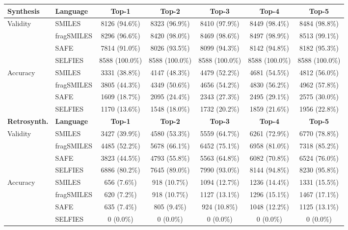 \begin{tabular}{llccccc}
    \toprule
    \textbf{Synthesis} & \textbf{Language} & \textbf{Top-1} & \textbf{Top-2} & \textbf{Top-3} & \textbf{Top-4} & \textbf{Top-5} \\
    \toprule
    Validity & SMILES & 8126 (94.6\%) & 8323 (96.9\%) & 8410 (97.9\%) & 8449 (98.4\%) & 8484 (98.8\%) \\
    ~ & fragSMILES & 8296 (96.6\%) & 8420 (98.0\%) & 8469 (98.6\%) & 8497 (98.9\%) & 8513 (99.1\%) \\
    ~ & SAFE & 7814 (91.0\%) & 8026 (93.5\%) & 8099 (94.3\%) & 8142 (94.8\%) & 8182 (95.3\%) \\
    ~ & SELFIES & 8588 (100.0\%) & 8588 (100.0\%) & 8588 (100.0\%) & 8588 (100.0\%) & 8588 (100.0\%) \\
    \hline
    Accuracy & SMILES & 3331 (38.8\%) & 4147 (48.3\%) & 4479 (52.2\%) & 4681 (54.5\%) & 4812 (56.0\%) \\
    ~ & fragSMILES & 3805 (44.3\%) & 4349 (50.6\%) & 4656 (54.2\%) & 4830 (56.2\%) & 4962 (57.8\%) \\
    ~ & SAFE & 1609 (18.7\%) & 2095 (24.4\%) & 2343 (27.3\%) & 2495 (29.1\%) & 2575 (30.0\%) \\
    ~ & SELFIES & 1170 (13.6\%) & 1548 (18.0\%) & 1732 (20.2\%) & 1859 (21.6\%) & 1956 (22.8\%) \\
    \toprule
    \textbf{Retrosynth.} &  \textbf{Language} & \textbf{Top-1} & \textbf{Top-2} & \textbf{Top-3} & \textbf{Top-4} & \textbf{Top-5}\\
    \toprule
    Validity & SMILES & 3427 (39.9\%) & 4580 (53.3\%) & 5559 (64.7\%) & 6261 (72.9\%) & 6770 (78.8\%) \\
    ~ & fragSMILES & 4485 (52.2\%) & 5678 (66.1\%) & 6452 (75.1\%) & 6958 (81.0\%) & 7318 (85.2\%) \\
    ~ & SAFE & 3823 (44.5\%) & 4793 (55.8\%) & 5563 (64.8\%) & 6082 (70.8\%) & 6524 (76.0\%) \\
    ~ & SELFIES & 6886 (80.2\%) & 7645 (89.0\%) & 7990 (93.0\%) & 8144 (94.8\%) & 8230 (95.8\%) \\
    \hline
    Accuracy & SMILES & 656 (7.6\%) & 918 (10.7\%) & 1094 (12.7\%) & 1236 (14.4\%) & 1331 (15.5\%) \\
    ~ & fragSMILES & 620 (7.2\%) & 918 (10.7\%) & 1127 (13.1\%) & 1296 (15.1\%) & 1467 (17.1\%) \\
    ~ & SAFE & 635 (7.4\%) & 805 (9.4\%) & 924 (10.8\%) & 1048 (12.2\%) & 1125 (13.1\%) \\
    ~ & SELFIES & 0 (0.0\%) & 0 (0.0\%) & 0 (0.0\%) & 0 (0.0\%) & 0 (0.0\%) \\
    \bottomrule
\end{tabular}